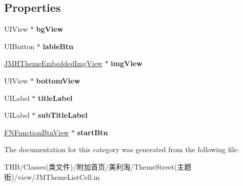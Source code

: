 \subsection*{Properties}
\begin{DoxyCompactItemize}
\item 
\mbox{\label{category_j_m_theme_list_cell_07_08_ab4f2bcc72db63be124a42853142c8d72}} 
U\+I\+View $\ast$ {\bfseries bg\+View}
\item 
\mbox{\label{category_j_m_theme_list_cell_07_08_a6687201f26910e3312d5ab847b641426}} 
U\+I\+Button $\ast$ {\bfseries lable\+Btn}
\item 
\mbox{\label{category_j_m_theme_list_cell_07_08_a0cda365bea122f39c033288d4d1bc47b}} 
\mbox{\hyperlink{interface_j_m_h_theme_embedded_img_view}{J\+M\+H\+Theme\+Embedded\+Img\+View}} $\ast$ {\bfseries img\+View}
\item 
\mbox{\label{category_j_m_theme_list_cell_07_08_a76c849aeb2438480b8d8a2d7e2af25a4}} 
U\+I\+View $\ast$ {\bfseries bottom\+View}
\item 
\mbox{\label{category_j_m_theme_list_cell_07_08_a49a1f13d7c2cf2fe1a8e13ab0eac1137}} 
U\+I\+Label $\ast$ {\bfseries title\+Label}
\item 
\mbox{\label{category_j_m_theme_list_cell_07_08_a5702d25b37eb2aa2b55fd647bf5bcd8a}} 
U\+I\+Label $\ast$ {\bfseries sub\+Title\+Label}
\item 
\mbox{\label{category_j_m_theme_list_cell_07_08_a790e182e803bf91afd8ae332a5bedb4f}} 
\mbox{\hyperlink{interface_f_n_function_btn_view}{F\+N\+Function\+Btn\+View}} $\ast$ {\bfseries start\+Btn}
\end{DoxyCompactItemize}


The documentation for this category was generated from the following file\+:\begin{DoxyCompactItemize}
\item 
T\+H\+B/\+Classes(类文件)/附加首页/美利淘/\+Theme\+Street(主题街)/view/J\+M\+Theme\+List\+Cell.\+m\end{DoxyCompactItemize}
